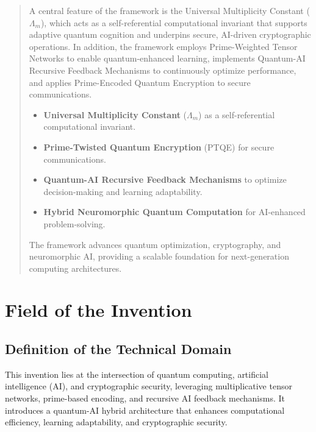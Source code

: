 \documentclass{article}
\theoremstyle{plain}
\begin{document}
\begin{itemize}
\begin{abstract}
A central feature of the framework is the Universal Multiplicity Constant ($\Lambda_m$), which acts as a self-referential computational invariant that supports adaptive quantum cognition and underpins secure, AI-driven cryptographic operations. In addition, the framework employs Prime-Weighted Tensor Networks to enable quantum-enhanced learning, implements Quantum-AI Recursive Feedback Mechanisms to continuously optimize performance, and applies Prime-Encoded Quantum Encryption to secure communications.
\begin{itemize}
    \item \textbf{Universal Multiplicity Constant} ($\Lambda_m$) as a self-referential computational invariant.
    \item \textbf{Prime-Twisted Quantum Encryption} (PTQE) for secure communications.
    \item \textbf{Quantum-AI Recursive Feedback Mechanisms} to optimize decision-making and learning adaptability.
    \item \textbf{Hybrid Neuromorphic Quantum Computation} for AI-enhanced problem-solving.
\end{itemize}
The framework advances quantum optimization, cryptography, and neuromorphic AI, providing a scalable foundation for next-generation computing architectures.
\end{abstract}

\newpage
 \begin{multicols}{2}
\begin{singlespace}
\tableofcontents
\end{singlespace}
\end{multicols}

\linenumbers
\section{Field of the Invention}

\subsection{Definition of the Technical Domain}
This invention lies at the intersection of quantum computing, artificial intelligence (AI), and cryptographic security, leveraging multiplicative tensor networks, prime-based encoding, and recursive AI feedback mechanisms. It introduces a quantum-AI hybrid architecture that enhances computational efficiency, learning adaptability, and cryptographic security.


\end{itemize}
\end{document}
